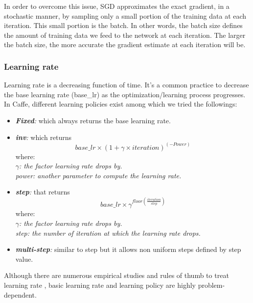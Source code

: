 \indent In order to overcome this issue, SGD approximates the exact gradient, in a stochastic manner, by sampling only a small portion of the training data at each iteration. This small portion is the batch. In other words, the batch size defines the amount of training data we feed to the network at each iteration. The larger the batch size, the more accurate the gradient estimate at each iteration will be. 

\subsubsection{Learning rate}
\label{learning rate}
Learning rate is a decreasing function of time. It's a common practice to decrease the base learning rate (base\_lr) as the optimization/learning process progresses. In Caffe, different learning policies exist among which we tried the followings:
\begin{itemize}
\item \textit{\textbf{Fixed}:} which always returns the base learning rate.
\item \textit{\textbf{inv}:} which returns $$base\_lr \times (1 + \gamma \times iteration) ^ {(-Power)}$$ where:\\\textit{ $\gamma$: the factor learning rate drops by.}\\\textit{power: another parameter to compute the learning rate.}

\item \textit{\textbf{step}:} that returns $$base\_lr \times \gamma ^ {floor(\frac{iteration}{step})}$$ where:\\ \textit{$\gamma$: the factor learning rate drops by.}\\\textit{step: the number of iteration at which the learning rate drops.} 
\item \textit{\textbf{multi-step}:} similar to step but it allows non uniform steps defined by step value.
\end{itemize}
Although there are numerous empirical studies and rules of thumb to treat learning rate \cite{senior2013empirical,yu1995dynamic,minai1990acceleration}, basic learning rate and learning policy are highly problem-dependent.  

